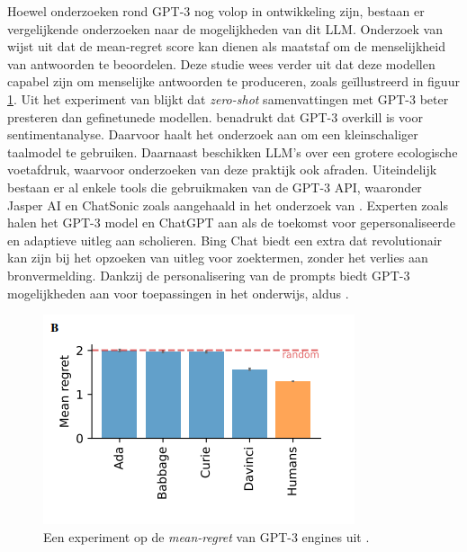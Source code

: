 Hoewel onderzoeken rond GPT-3 nog volop in ontwikkeling zijn, bestaan er vergelijkende onderzoeken naar de mogelijkheden van dit LLM. Onderzoek van \textcite{Binz2023} wijst uit dat de mean-regret score kan dienen als maatstaf om de menselijkheid van antwoorden te beoordelen. Deze studie wees verder uit dat deze modellen capabel zijn om menselijke antwoorden te produceren, zoals geïllustreerd in figuur \ref{img:mean-regret-chatgpt}. Uit het experiment van \textcite{Goyal2022} blijkt dat \textit{zero-shot} samenvattingen met GPT-3 beter presteren dan gefinetunede modellen. \textcite{Li2022} benadrukt dat GPT-3 overkill is voor sentimentanalyse. Daarvoor haalt het onderzoek aan om een kleinschaliger taalmodel te gebruiken. Daarnaast beschikken LLM's over een grotere ecologische voetafdruk, waarvoor onderzoeken van \textcite{Strubell2019, Simon2021} deze praktijk ook afraden. Uiteindelijk bestaan er al enkele tools die gebruikmaken van de GPT-3 API, waaronder Jasper AI en ChatSonic zoals aangehaald in het onderzoek van \textcite{Mottesi2023}. Experten zoals \textcite{Roose2023, Garg2022} halen het GPT-3 model en ChatGPT aan als de toekomst voor gepersonaliseerde en adaptieve uitleg aan scholieren. Bing Chat biedt een extra dat revolutionair kan zijn bij het opzoeken van uitleg voor zoektermen, zonder het verlies aan bronvermelding. Dankzij de personalisering van de prompts biedt GPT-3 mogelijkheden aan voor toepassingen in het onderwijs, aldus \textcite{Roose2023, Garg2022}.

\begin{figure}[H]
	\begin{center}
		\includegraphics[width=\linewidth]{img/chatgpt-engines-mean-regret.png}
		\caption{Een experiment op de \textit{mean-regret} van GPT-3 engines uit \textcite{Binz2023}.}
		\label{img:mean-regret-chatgpt}
	\end{center}
\end{figure}

